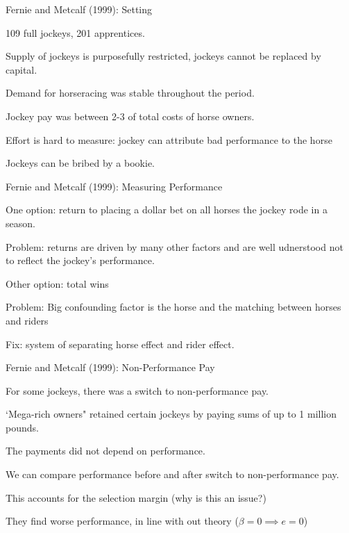 \documentclass[aspectratio=169,usenames,dvipsnames]{beamer}
\newenvironment{wideitemize}{\itemize\addtolength{\itemsep}{10pt}}{\enditemize}
\begin{document}
\begin{frame}{Fernie and Metcalf (1999): Setting }
    \begin{wideitemize}
        \item 109 full jockeys, 201 apprentices.
        \item Supply of jockeys is purposefully restricted, jockeys cannot be replaced by capital.
        \item Demand for horseracing was stable throughout the period.
        \item Jockey pay was between 2-3 of total costs of horse owners.
        \item Effort is hard to measure: jockey can attribute bad performance to the horse
        \item Jockeys can be bribed by a bookie.        
    \end{wideitemize}
\end{frame}

\begin{frame}{Fernie and Metcalf (1999): Measuring Performance }
    \begin{wideitemize}
        \item    One option: return to placing a dollar bet on all horses the jockey rode in a season.
        \item Problem: returns are driven by many other factors and are well udnerstood not to reflect the jockey's performance.
        \item Other option: total wins
        \item Problem: Big confounding factor is the horse and the matching between horses and riders
        \item Fix: system of separating horse effect and rider effect.
    \end{wideitemize}
\end{frame}





\begin{frame}{Fernie and Metcalf (1999): Non-Performance Pay }
    \begin{wideitemize}
        \item    For some jockeys, there was a switch to non-performance pay.
        \item `Mega-rich owners" retained certain jockeys by paying sums of up to 1 million pounds.
        \item The payments did not depend on performance.
        \item We can compare performance before and after switch to non-performance pay.
        \item This accounts for the selection margin (why is this an issue?)
        \item They find worse performance, in line with out theory ($\beta=0 \implies e=0$)
    \end{wideitemize}
\end{frame}
\end{document}
